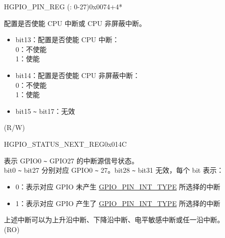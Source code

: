 \addtocounter{Regfloat}{-1}
\begin{register}{H}{GPIO\_PIN\_REG (: 0-27)}{0x0074+4*}
\begin{regdesc}\begin{reglist}
\item [接上页]
\label{fielddesc:GPIOPINNINTENA}\item [GPIO\_PIN\regindex{n}\_INT\_ENA] 配置是否使能 CPU 中断或 CPU 非屏蔽中断。
\begin{itemize}
    \item bit13：配置是否使能 CPU 中断：\\
    0：不使能\\
    1：使能\\
    \item bit14：配置是否使能 CPU 非屏蔽中断： \\
    0：不使能\\
    1：使能\\
    \item bit15 \verb+~+ bit17：无效
    \end{itemize} (R/W)
\end{reglist}\end{regdesc}
\end{register}


\begin{register}{H}{GPIO\_STATUS\_NEXT\_REG}{0x014C}\label{regdesc:GPIOSTATUSNEXTREG}
%
\regnewline%
\begin{regdesc}\begin{reglist}
\label{fielddesc:GPIOSTATUSINTERRUPTNEXT}\item [GPIO\_STATUS\_INTERRUPT\_NEXT] 表示 GPIO0 \verb+~+ GPIO27 的中断源信号状态。\\
bit0 \verb+~+ bit27 分别对应 GPIO0 \verb+~+ 27。bit28 \verb+~+ bit31 无效，每个 bit 表示：
\begin{itemize}
        \item 0：表示对应 GPIO 未产生 \hyperref[fielddesc:GPIOPINNINTTYPE]{GPIO\_PIN\_INT\_TYPE} 所选择的中断
        \item 1：表示对应 GPIO 产生了 \hyperref[fielddesc:GPIOPINNINTTYPE]{GPIO\_PIN\_INT\_TYPE} 所选择的中断
\end{itemize}
上述中断可以为上升沿中断、下降沿中断、电平敏感中断或任一沿中断。\\  (RO)

\end{reglist}\end{regdesc}
\end{register}


